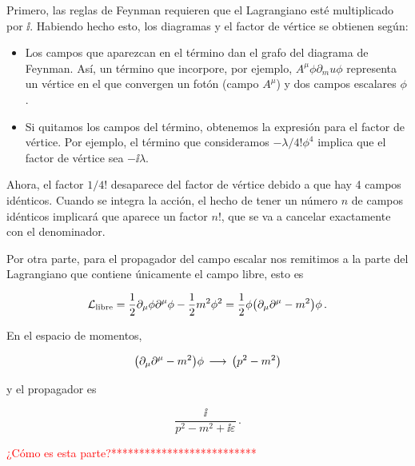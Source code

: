 \begin{cabox}
	Primero, las reglas de Feynman requieren que el Lagrangiano esté multiplicado por $\ii$. Habiendo hecho esto, los diagramas y el factor de vértice se obtienen según:
	
	\begin{itemize}
		\item Los campos que aparezcan en el término dan el grafo del diagrama de Feynman. Así, un término que incorpore, por ejemplo, $A^\mu \phi \partial_mu \phi$ representa un vértice en el que convergen un fotón (campo $A^\mu$) y dos campos escalares $\phi$.
		
		\item Si quitamos los campos del término, obtenemos la expresión para el factor de vértice. Por ejemplo, el término que consideramos $-\lambda/4! \phi^4$ implica que el factor de vértice sea $-\ii \lambda$.
	\end{itemize}
	
	Ahora, el factor $1/4!$ desaparece del factor de vértice debido a que hay 4 campos idénticos. Cuando se integra la acción, el hecho de tener un número $n$ de campos idénticos implicará que aparece un factor $n!$, que se va a cancelar exactamente con el denominador.
	
	Por otra parte, para el propagador del campo escalar nos remitimos a la parte del Lagrangiano que contiene únicamente el campo libre, esto es
	
	\begin{equation*}
		\mathcal{L}_{\text{libre}} = \frac{1}{2}\partial_\mu \phi \partial^\mu \phi - \frac{1}{2} m^2 \phi^2 = \frac{1}{2} \phi \qty(\partial_\mu \partial^\mu - m^2)\phi \,.
	\end{equation*}

	En el espacio de momentos, 
	
	\begin{equation*}
		\qty(\partial_\mu \partial^\mu - m^2) \phi \, \longrightarrow \, \qty(p^2 - m^2)
	\end{equation*}

	\noindent y el propagador es
	
	\begin{equation*}
		\frac{\ii}{p^2 - m^2 + \ii \varepsilon} \,.
	\end{equation*}
\end{cabox}

\textcolor{red}{¿Cómo es esta parte?**************************}

